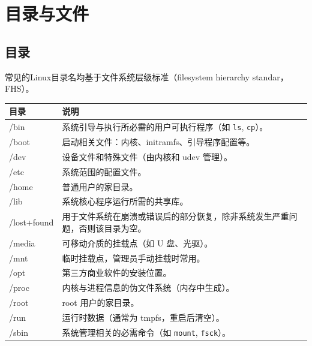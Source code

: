 \section{目录与文件}
\subsection{目录}
常见的Linux目录名均基于文件系统层级标准（filesystem hierarchy standar，FHS）。
\begin{table}[H]
	\centering
	\begin{tabular}{|l|p{11cm}|}
		\hline
		\textbf{目录}    & \textbf{说明}                                             \\
		\hline
		/bin           & 系统引导与执行所必需的用户可执行程序（如 \texttt{ls}, \texttt{cp}）。         \\
		\hline
		/boot          & 启动相关文件：内核、initramfs、引导程序配置等。                            \\
		\hline
		/dev           & 设备文件和特殊文件（由内核和 udev 管理）。                                \\
		\hline
		/etc           & 系统范围的配置文件。                                              \\
		\hline
		/home          & 普通用户的家目录。                                               \\
		\hline
		/lib           & 系统核心程序运行所需的共享库。                                         \\
		\hline
		/lost+found    & 用于文件系统在崩溃或错误后的部分恢复，除非系统发生严重问题，否则该目录为空。                  \\
		\hline
		/media         & 可移动介质的挂载点（如 U 盘、光驱）。                                    \\
		\hline
		/mnt           & 临时挂载点，管理员手动挂载时常用。                                       \\
		\hline
		/opt           & 第三方商业软件的安装位置。                                           \\
		\hline
		/proc          & 内核与进程信息的伪文件系统（内存中生成）。                                   \\
		\hline
		/root          & root 用户的家目录。                                            \\
		\hline
		/run           & 运行时数据（通常为 tmpfs，重启后清空）。                                 \\
		\hline
		/sbin          & 系统管理相关的必需命令（如 \texttt{mount}, \texttt{fsck}）。           \\

\end{tabular}
\end{table}
